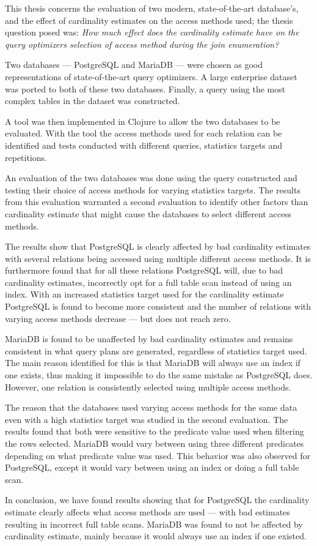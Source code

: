 This thesis concerns the evaluation of two modern, state-of-the-art database's,
and the effect of cardinality estimates on the access methods used; the thesis
question posed was:
\textit{How much effect does the cardinality estimate have on the query optimizers
            selection of access method during the join enumeration?}

Two databases --- PostgreSQL and MariaDB --- were chosen as good representations of
state-of-the-art query optimizers. A large enterprise dataset was ported to both
of these two databases. Finally, a query using the most complex
tables in the dataset was constructed.

A tool was then implemented in Clojure to allow the two databases to be
evaluated. With the tool the access methods used for each relation can be
identified and tests conducted with different queries, statistics targets and
repetitions.

An evaluation of the two databases was done using the query constructed and
testing their choice of access methods for varying statistics targets. The results
from this evaluation warranted a second evaluation to identify other factors
than cardinality estimate that might cause the databases to select different
access methods.

The results show that PostgreSQL is clearly affected by bad cardinality
estimates with several relations being accessed using multiple different access
methods. It is furthermore found that for all these relations PostgreSQL will,
due to bad cardinality estimates, incorrectly opt for a full table scan instead
of using an index. With an increased statistics target used for the cardinality
estimate PostgreSQL is found to become more consistent and the number of
relations with varying access methods decrease --- but does not reach zero.

MariaDB is found to be unaffected by bad cardinality estimates and remains
consistent in what query plans are generated, regardless of statistics target
used. The main reason identified for this is that MariaDB will always use an
index if one exists, thus making it impossible to do the same mistake as
PostgreSQL does. However, one relation is consistently selected using multiple
access methods.

The reason that the databases used varying access methods for the same data even
with a high statistics target was studied in the second evaluation. The results
found that both were sensitive to the predicate value used when filtering the
rows selected. MariaDB would vary between using three different predicates
depending on what predicate value was used. This behavior was also observed for
PostgreSQL, except it would vary between using an index or doing a full table scan.

In conclusion, we have found results showing that for PostgreSQL the cardinality
estimate clearly affects what access methods are used --- with bad estimates
resulting in incorrect full table scans. MariaDB was found to not be affected
by cardinality estimate, mainly because it would always use an index if one existed.